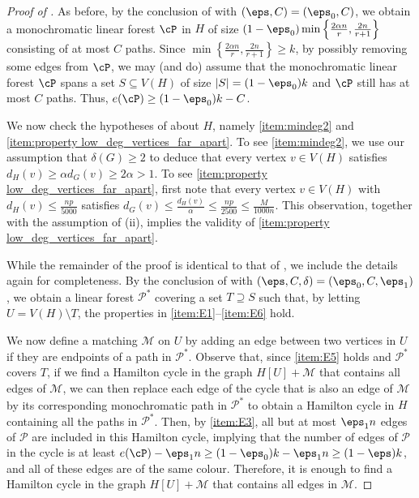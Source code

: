 \documentclass[10pt,a4paper,reqno]{amsart}
\begin{document}
\begin{proof}[Proof of ]
As before, by the conclusion of  with $(\eps, C) = (\eps_0, C)$, we obtain a monochromatic linear forest $\cP$ in $H$ of size $(1 - \eps_0)\min\left\{ \frac{2\alpha n}{r}, \frac{2n}{r+1} \right\}$ consisting of at most $C$ paths. Since $\min\left\{ \frac{2\alpha n}{r}, \frac{2n}{r+1} \right\}\geq k$, by possibly removing some edges from $\cP$, we may (and do) assume that the monochromatic linear forest $\cP$ spans a set $S\subseteq V(H)$ of size $|S| = (1 - \eps_0) k$ and $\cP$ still has at most $C$ paths. Thus, $e(\cP)\ge (1 - \eps_0) k - C$.

We now check the hypotheses of  about $H$, namely \ref{item:mindeg2} and \ref{item:property low_deg_vertices_far_apart}. To see \ref{item:mindeg2}, we use our assumption that $\delta(G)\ge 2$ to deduce that every vertex $v\in V(H)$ satisfies $d_H(v) \geq \alpha d_G(v) \geq 2\alpha > 1$. To see \ref{item:property low_deg_vertices_far_apart}, first note that every vertex $v\in V(H)$ with $d_H(v)\le \frac{np}{5000}$ satisfies $d_G(v)\le \frac{d_H(v)}{\alpha}\le \frac{np}{2500}\le \frac{M}{1000n}$. This observation, together with the assumption of (ii), implies the validity of \ref{item:property low_deg_vertices_far_apart}.

While the remainder of the proof is identical to that of , we include the details again for completeness. By the conclusion of  with $(\eps, C, \delta) = (\eps_0, C, \eps_1)$, we obtain a linear forest $\mathcal{P}^*$ covering a set $T \supseteq S$ such that, by letting $U = V(H) \setminus T$, the properties in \ref{item:E1}--\ref{item:E6} hold.
  
We now define a matching $\mathcal{M}$ on $U$ by adding an edge between two vertices in $U$ if they are endpoints of a path in $\mathcal{P}^*$. Observe that, since \ref{item:E5} holds and $\mathcal{P}^*$ covers $T$, if we find a Hamilton cycle in the graph $H[U] + \mathcal{M}$ that contains all edges of $\mathcal{M}$, we can then replace each edge of the cycle that is also an edge of $\mathcal{M}$ by its corresponding monochromatic path in $\mathcal{P}^*$ to obtain a Hamilton cycle in $H$ containing all the paths in $\mathcal{P}^*$. Then, by \ref{item:E3}, all but at most $\eps_1 n$ edges of $\mathcal{P}$ are included in this Hamilton cycle, implying that the number of edges of $\mathcal{P}$ in the cycle is at least $e(\cP) - \eps_1 n \geq (1 - \eps_0)k - \eps_1 n \ge (1 - \eps) k$, and all of these edges are of the same colour. Therefore, it is enough to find a Hamilton cycle in the graph $H[U] + \mathcal{M}$ that contains all edges in $\mathcal{M}$.


\end{proof}
\end{document}

